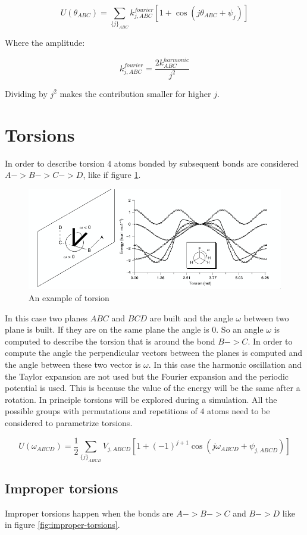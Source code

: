 	$$U(\theta_{ABC}) = \sum\limits_{\{j\}_{ABC}}k^{fourier}_{j,ABC}[1+\cos(j\theta_{ABC}+\psi_j)]$$

	Where the amplitude:

	$$k_{j, ABC}^{fourier} = \frac{2k^{harmonic}_{ABC}}{j^2}$$

	Dividing by $j^2$ makes the contribution smaller for higher $j$.

\section{Torsions}
In order to describe torsion $4$ atoms bonded by subsequent bonds are considered $A->B->C->D$, like if figure \ref{fig:torsions}.

\begin{figure}[H]
	\includegraphics[width=\textwidth]{torsions}
	\caption{An example of torsion}
	\label{fig:torsions}
\end{figure}

In this case two planes $ABC$ and $BCD$ are built and the angle $\omega$ between two plane is built.
If they are on the same plane the angle is $0$.
So an angle $\omega$ is computed to describe the torsion that is around the bond $B->C$.
In order to compute the angle the perpendicular vectors between the planes is computed and the angle between these two vector is $\omega$.
In this case the harmonic oscillation and the Taylor expansion are not used but the Fourier expansion and the periodic potential is used.
This is because the value of the energy will be the same after a rotation.
In principle torsions will be explored during a simulation.
All the possible groups with permutations and repetitions of $4$ atoms need to be considered to parametrize torsions.

$$U(\omega_{ABCD}) = \frac{1}{2}\sum\limits_{\{j\}_{ABCD}}V_{j,ABCD}[1+(-1)^{j+1}\cos(j\omega_{ABCD}+\psi_{j,ABCD})]$$

	\subsection{Improper torsions}
	Improper torsions happen when the bonds are $A->B->C$ and $B->D$ like in figure \ref{fig:improper-torsions}.

